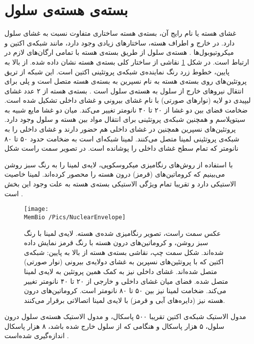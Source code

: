 \setRL
{} 


\section{\label{sec:nuclearenvelope}
بسته‌ی هسته‌ی سلول
}
غشای هسته یا نام رایج آن، بسته‌ی هسته
ساختاری متفاوت نسبت به غشای سلول دارد. در خارج و اطراف هسته، ساختارهای زیادی وجود دارد، مانند شبکه‌ی اکتین
 و میکروتیوبول‌ها
. هسته‌ی سلول از طریق بسته‌ی هسته با تمامی‌ ارگان‌های لازم در ارتباط است. در شکل 
\ref{fig:nuclearenvelope}
نقاشی از ساختار کلی بسته‌ی هسته نشان داده شده. از بالا به پایین، خطوط زرد رنگ نماینده‌ی شبکه‌ی پروتئینی اکتین است. این شبکه از تریق پروتئین‌های روی بسته‌ی هسته به نام نسپرین
به بسته‌ی هسته متصل است و پلی برای انتقال نیرو‌های خارج از سلول به هسته‌ی سلول است
\cite{Lammerding2011}
. بسته‌ی هسته از ۲ عدد غشای لیپیدی دو لایه (نوارهای صورتی) با نام غشای بیرونی و غشای داخلی تشکیل شده است. ضخامت فضای بین دو غشا از ۲۰ تا ۴۰ نانومتر تغییر می‌کند. میان دو غشا مایع شبیه به سیتوپلاسم و همچنین شبکه‌ی پروتئینی برای انتقال مواد بین هسته و سلول وجود دارد. پروتئین‌های نسپرین همچنین در غشای داخلی هم حضور دارند و غشای داخلی را به شبکه‌ی پروتئینی لمینا
متصل می‌کنند. لمینا‌ شبکه‌ای است به ضخامت حدود ۵۰ تا ۸۰ نانومتر که تمام سطح غشای داخلی را پوشانده است. در تصویر سمت راست شکل 

با استفاده از روش‌های رنگامیزی میکروسکوپی، لایه‌ی لمینا را به رنگ سبز روشن می‌بینیم که کروماتین‌های (قرمز) درون هسته را محصور کرده‌اند. لمینا خاصیت الاستیکی دارد و تقریبا تمام ویژگی الاستیکی بسته‌ی هسته به علت وجود این بخش است
\cite{Steensel2017wd}
. 


\begin{figure}[h]
\begin{center}
\texttt{[image: \\MemBio /Pics/NuclearEnvelope]}
\caption{
عکس سمت راست، تصویر رنگامیزی شده‌ی هسته. لایه‌ی لمینا با رنگ سبز روشن، و کروماتین‌های درون هسته با رنگ قرمز نمایش داده‌ شده‌اند. شکل سمت چپ، نقاشی بسته‌ی هسته از بالا به پایین: شبکه‌ی اکتین که با پروتئین‌های نسپرین به غشای دولایه‌ی بیرونی (نوار صورتی) متصل شده‌اند. غشای داخلی نیز به کمک همین پروتئین به لایه‌ی لمینا متصل شده. فضای میان غشای داخلی و خارجی از ۲۰ تا ۴۰ نانومتر تغییر می‌کند. ضخامت لمینا نیز بین ۵۰ تا ۸۰ نانومتر است. کروماتین‌های درون هسته نیز (دایره‌های آبی و قرمز) با لایه‌ی لمینا اتصالاتی برقرار می‌کنند. 
}
\label{fig:nuclearenvelope}
\end{center}
\end{figure}
مدول الاستیک شبکه‌ی اکتین تقریبا ۵۰۰ پاسکال، و مدول الاستیک هسته‌ی سلول درون سلول، ۵ هزار پاسکال و هنگامی ‌که از سلول خارج شده باشد، ۸ هزار پاسکال اندازه‌گیری شده‌است
\cite{Dahl2004, CAILLE2002177}
.







